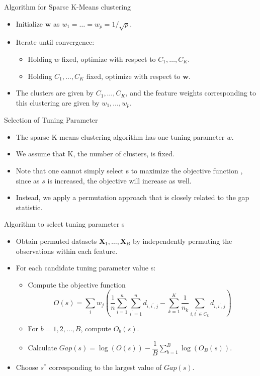 \documentclass[12pt]{beamer}
\begin{document}
\begin{frame}{Algorithm for Sparse K-Means clustering}
\begin{itemize}
\item Initialize $\mathbf{w}$ as $w_1=\dots=w_p=1/\sqrt{p}$.
\item Iterate until convergence:
\begin{itemize}
\item Holding $w$ fixed, optimize with respect to $C_1,\dots,C_K$.
\item Holding $C_1,\dots,C_K$ fixed, optimize with respect to $\mathbf{w}$.
\end{itemize}
\item The clusters are given by $C_1,\dots,C_K$, and the feature
weights corresponding to this clustering are given by $w_1,\dots,w_p$.
\end{itemize}
\end{frame}

\begin{frame}{Selection of Tuning Parameter}
\begin{itemize}
\item The sparse K-means clustering algorithm has one tuning parameter $w$.
\item We assume that K, the number of clusters, is fixed.
\item Note that
one cannot simply select s to maximize the objective function
, since as $s$ is increased, the objective will increase as
well.
\item Instead, we apply a permutation approach that is closely
related to the gap statistic.
\end{itemize}
\end{frame}

\begin{frame}{Algorithm to select tuning parameter s}
\begin{itemize}
\item Obtain permuted datasets $\mathbf{X}_1,\dots,\mathbf{X}_B$ by independently
permuting the observations within each feature.
\item For each candidate tuning parameter value s:
\begin{itemize}
\item Compute the objective function $$O(s)=\sum_{i} w_{j}(\frac{1}{n} \sum_{i=1}^{n} \sum_{i^{\prime}=1}^{n} d_{i, i^{\prime}, j}-\sum_{k=1}^{K} \frac{1}{n_{k}} \sum_{i, i^{\prime} \in C_{k}} d_{i, i^{\prime}, j})$$
\item For $b=1,2,\dots,B$, compute $O_b(s)$.
\item Calculate $Gap(s)=\log(O(s))-\dfrac{1}{B}\sum_{b=1}^B \log(O_B(s))$.
\end{itemize}
\item Choose $s^{*}$ corresponding to the largest value of $Gap(s)$.
\end{itemize}
\end{frame}
\end{document}
